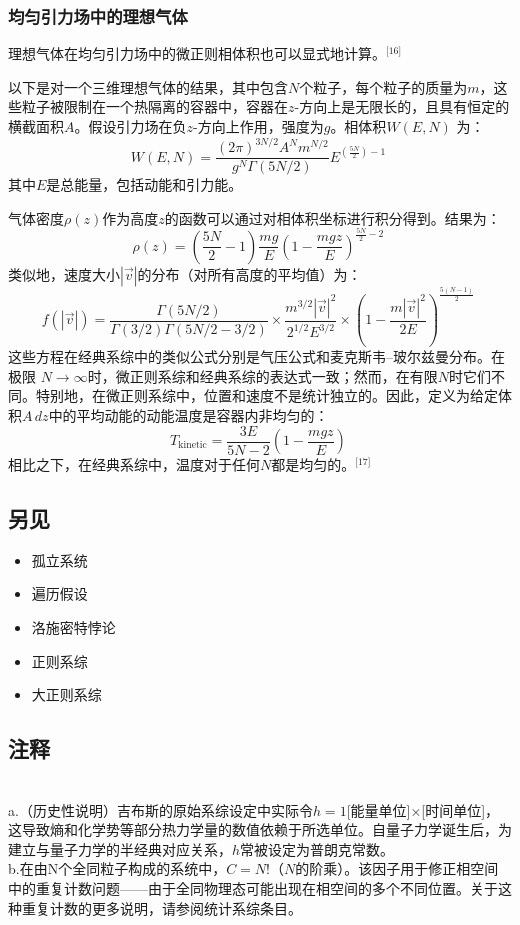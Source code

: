 \subsubsection{均匀引力场中的理想气体}  
理想气体在均匀引力场中的微正则相体积也可以显式地计算。\(^\text{[16]}\)

以下是对一个三维理想气体的结果，其中包含\(N\)个粒子，每个粒子的质量为\( m \)，这些粒子被限制在一个热隔离的容器中，容器在\( z \)-方向上是无限长的，且具有恒定的横截面积\(A\)。假设引力场在负\(z\)-方向上作用，强度为\( g \)。相体积\(W(E, N)\) 为：
\[
W(E, N) = \frac{(2\pi)^{3N/2} A^N m^{N/2}}{g^N \Gamma(5N/2)} E^{(\frac{5N}{2}) - 1}~
\]
其中\(E\)是总能量，包括动能和引力能。

气体密度\(\rho(z)\)作为高度\(z\)的函数可以通过对相体积坐标进行积分得到。结果为：
\[
\rho(z) = \left( \frac{5N}{2} - 1 \right) \frac{mg}{E} \left( 1 - \frac{mgz}{E} \right)^{\frac{5N}{2} - 2}~
\]
类似地，速度大小\( |\vec{v}| \)的分布（对所有高度的平均值）为：
\[
f(|\vec{v}|) = \frac{\Gamma(5N/2)}{\Gamma(3/2)\Gamma(5N/2 - 3/2)} \times \frac{m^{3/2} |\vec{v}|^2}{2^{1/2} E^{3/2}} \times \left( 1 - \frac{m|\vec{v}|^2}{2E} \right)^{\frac{5(N-1)}{2}}~
\]
这些方程在经典系综中的类似公式分别是气压公式和麦克斯韦–玻尔兹曼分布。在极限 \( N \to \infty \)时，微正则系综和经典系综的表达式一致；然而，在有限\( N \)时它们不同。特别地，在微正则系综中，位置和速度不是统计独立的。因此，定义为给定体积\( A \, dz \)中的平均动能的动能温度是容器内非均匀的：
\[
T_{\mathrm{kinetic}} = \frac{3E}{5N-2} \left( 1 - \frac{mgz}{E} \right)~
\]
相比之下，在经典系综中，温度对于任何\(N\)都是均匀的。\(^\text{[17]}\)
\subsection{另见}  
\begin{itemize}
\item 孤立系统  
\item 遍历假设  
\item 洛施密特悖论  
\item 正则系综  
\item 大正则系综
\end{itemize}
\subsection{注释}\\  
a.（历史性说明）吉布斯的原始系综设定中实际令\(h = 1\)[能量单位]×[时间单位]，这导致熵和化学势等部分热力学量的数值依赖于所选单位。自量子力学诞生后，为建立与量子力学的半经典对应关系，\(h\)常被设定为普朗克常数。\\  
b.在由N个全同粒子构成的系统中，\(C = N!\)（\(N\)的阶乘）。该因子用于修正相空间中的重复计数问题——由于全同物理态可能出现在相空间的多个不同位置。关于这种重复计数的更多说明，请参阅统计系综条目。\\  
